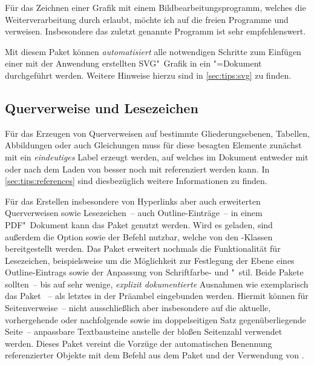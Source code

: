 Für das Zeichnen einer Grafik mit einem Bildbearbeitungsprogramm, welches die 
Weiterverarbeitung durch  erlaubt, möchte ich auf die freien 
Programme  und  verweisen. 
Insbesondere das zuletzt genannte Programm ist sehr empfehlenswert. 

\begin{DeclarePackages}
  Mit diesem Paket können \emph{automatisiert} alle notwendigen Schritte zum 
  Einfügen einer mit der Anwendung  erstellten 
  SVG"~Grafik in ein "=Dokument durchgeführt werden. Weitere 
  Hinweise hierzu sind in \autoref{sec:tips:svg} zu finden.
\end{DeclarePackages}
%



\subsection{%
  Querverweise und Lesezeichen%
}
%
Für das Erzeugen von Querverweisen auf bestimmte Gliederungsebenen, Tabellen, 
Abbildungen oder auch Gleichungen muss für diese besagten Elemente zunächst mit 
 ein \emph{eindeutiges} Label erzeugt werden, auf 
welches im Dokument entweder mit  oder nach dem Laden von 
 besser noch mit  referenziert werden kann. In 
\autoref{sec:tips:references} sind diesbezüglich weitere Informationen zu 
finden.

\begin{DeclarePackages}
  Für das Erstellen insbesondere von Hyperlinks aber auch erweiterten 
  Querverweisen sowie Lesezeichen~-- auch Outline-Einträge~-- in einem 
  PDF"~Dokument kann das Paket  genutzt werden. Wird 
  es geladen, sind außerdem die Option  sowie der Befehl 
   nutzbar, welche von den \TUDScript-Klassen bereitgestellt 
  werden. Das Paket  erweitert nochmals die Funktionalität 
  für Lesezeichen, beispielsweise um die Möglichkeit zur Festlegung der Ebene 
  eines Outline-Eintrags sowie der Anpassung von Schriftfarbe- und "~stil.
  Beide Pakete sollten~-- bis auf sehr wenige, \emph{explizit dokumentierte} 
  Ausnahmen wie exemplarisch das Paket ~-- als letztes in 
  der Präambel eingebunden werden.
  Hiermit können für Seitenverweise~-- nicht ausschließlich aber insbesondere 
  auf die aktuelle, vorhergehende oder nachfolgende sowie im doppelseitigen 
  Satz gegenüberliegende Seite~-- anpassbare Textbausteine anstelle der bloßen 
  Seitenzahl verwendet werden.
  Dieses Paket vereint die Vorzüge der automatischen Benennung referenzierter 
  Objekte mit dem Befehl  aus dem Paket  und 
  der Verwendung von .
\end{DeclarePackages}
%
%



